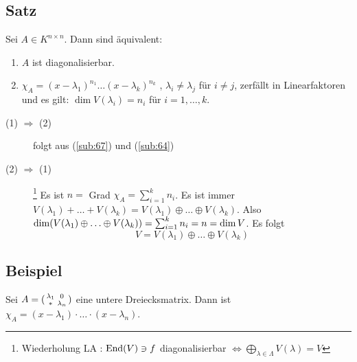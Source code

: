 \subsection[Satz über Diagonalisierbarkeit und Linearfaktoren des charakteristischen Polynoms]{Satz} %
\label{sub:68}
Sei $A \in K^{n \times n}$. Dann sind äquivalent:
\begin{enumerate}[(1)]
	\item $A$ ist diagonalisierbar.
	\item $\chi_A = (x- \lambda_1)^{n_1} \ldots (x-\lambda_k)^{n_k}$ , $\lambda_i \not= \lambda_j$ für $i \not=j$, zerfällt in Linearfaktoren und es gilt: 
	$\dim V(\lambda_i) = n_i$ für $i=1, \ldots , k$.
\end{enumerate}
\begin{description}
	\item[(1) $\Rightarrow$ (2)] folgt aus (\ref{sub:67}) und (\ref{sub:64})
	\item[(2) $\Rightarrow$ (1)] \footnote{Wiederholung LA : $ \operatorname{End}(V) \ni f$ diagonalisierbar $\Leftrightarrow \bigoplus_{\lambda  \in \Lambda} V(\lambda ) = V$}
	Es ist $n= $ Grad $\chi_A = \sum_{i=1}^{k} n_i$. Es ist immer $V(\lambda_1) + \ldots + V(\lambda_k) = V(\lambda_1) \oplus \ldots \oplus V(\lambda_k)$. Also 
	$\dim (V(\lambda_1) \oplus \ldots \oplus V(\lambda_k)) = \sum_{i=1}^{k} n_i = n = \dim V $. Es folgt 
	\[
		V=V(\lambda_1) \oplus \ldots \oplus V(\lambda_k) \tag*{$\square$}
	\]
\end{description}

\subsection[Beispiel: Zerfallen einer unteren Dreiecksmatrix in Linearfaktoren]{Beispiel} %
\label{sub:69}
Sei $A= (\begin{smallmatrix}\lambda_1 & 0 \\ * & \lambda_n \end{smallmatrix}) $ eine untere Dreiecksmatrix. Dann ist 
$\chi_A= (x-\lambda_1) \cdot \ldots \cdot (x-\lambda_n)$.

